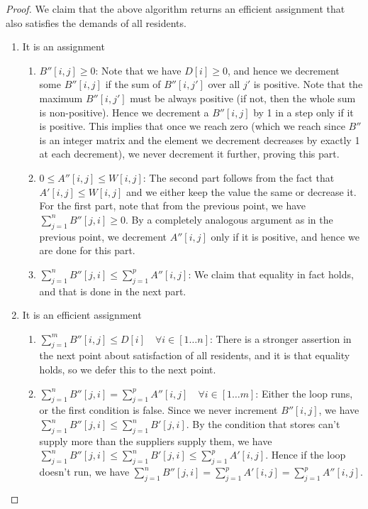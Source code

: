 \documentclass[answers]{exam}
\begin{document}
\begin{questions}
\begin{solution}
\begin{proof}
We claim that the above algorithm returns an efficient assignment that also satisfies the demands of all residents.

\begin{enumerate}
    \item It is an assignment
        \begin{enumerate}
            \item $B''[i, j] \ge 0$: Note that we have $D[i] \ge 0$, and hence we decrement some $B''[i, j]$ if the sum of $B''[i, j']$ over all $j'$ is positive. Note that the maximum $B''[i, j']$ must be always positive (if not, then the whole sum is non-positive). Hence we decrement a $B''[i, j]$ by 1 in a step only if it is positive. This implies that once we reach zero (which we reach since $B''$ is an integer matrix and the element we decrement decreases by exactly 1 at each decrement), we never decrement it further, proving this part.
            \item $0 \le A''[i, j] \le W[i, j]$: The second part follows from the fact that $A'[i, j] \le W[i, j]$ and we either keep the value the same or decrease it. 
            For the first part, note that from the previous point, we have $\sum_{j = 1}^n B''[j, i] \ge 0$. By a completely analogous argument as in the previous point, we decrement $A''[i, j]$ only if it is positive, and hence we are done for this part.
            \item $\sum_{j = 1}^n B''[j, i] \le \sum_{j = 1}^p A''[i, j]$: We claim that equality in fact holds, and that is done in the next part.
        \end{enumerate}
    \item It is an efficient assignment
        \begin{enumerate}
            \item $\sum_{j = 1}^m B''[i, j] \le D[i] \quad \forall i \in [1\ldots n]$:
                There is a stronger assertion in the next point about satisfaction of all residents, and it is that equality holds, so we defer this to the next point.
            \item $\sum_{j = 1}^n B''[j, i] = \sum_{j = 1}^p A''[i, j] \quad \forall i \in [1\ldots m]$:
                Either the loop runs, or the first condition is false. Since we never increment $B''[i, j]$, we have $\sum_{j = 1}^n B''[j, i] \le \sum_{j = 1}^n B'[j, i]$. By the condition that stores can't supply more than the suppliers supply them, we have $\sum_{j = 1}^n B''[j, i] \le \sum_{j = 1}^n B'[j, i] \le \sum_{j = 1}^p A'[i, j]$. Hence if the loop doesn't run, we have $\sum_{j = 1}^n B''[j, i] = \sum_{j = 1}^p A'[i, j] = \sum_{j = 1}^p A''[i, j]$.

\end{enumerate}
\end{enumerate}
\end{proof}
\end{solution}
\end{questions}
\end{document}
